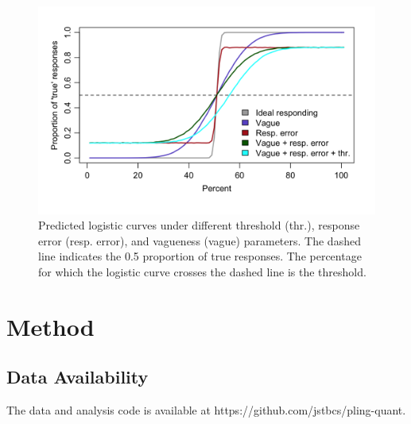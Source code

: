 \documentclass{article}
\begin{document}
\begin{figure} [H]
    \centering
    \includegraphics[width=1\textwidth]{Figure2.1.png}
    \caption{Predicted logistic curves under different threshold (thr.), response error (resp. error), and vagueness (vague) parameters. The dashed line indicates the 0.5 proportion of true responses. The percentage for which the logistic curve crosses the dashed line is the threshold.}
    \label{fig:fig2.1}
\end{figure}

\section{Method}
\subsection{Data Availability}
The data and analysis code is available at https://github.com/jstbcs/pling-quant.
\end{document}
